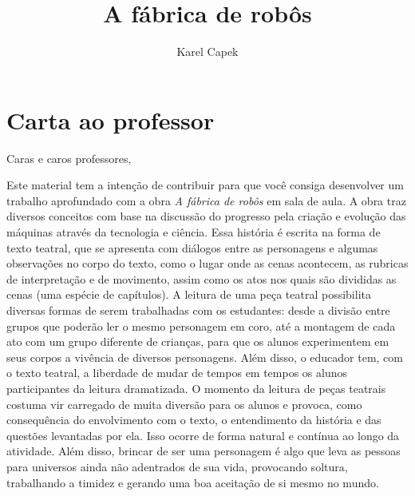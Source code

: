 \documentclass[11pt]{extarticle}
\newcommand{\AutorLivro}{Karel Capek}
\newcommand{\TituloLivro}{A fábrica de robôs}
\newcommand{\colaborador}{Gabriela Karam}
\begin{document}
\title{\TituloLivro}
\author{\AutorLivro}
\def\authornotes{\colaborador}

\date{}
\maketitle


\tableofcontents

\section{Carta ao professor}

Caras e caros professores,

Este material tem a intenção de contribuir para que você consiga desenvolver um trabalho aprofundado com a obra \textit{A fábrica de robôs} em sala de aula. A obra traz diversos conceitos com base na discussão do progresso pela criação e evolução das máquinas através da tecnologia e ciência. Essa história é escrita na forma de texto teatral, que se apresenta com diálogos entre as personagens e algumas observações no corpo do texto, como o lugar onde as cenas acontecem, as rubricas de interpretação e de movimento, assim como os atos nos quais são divididas as cenas (uma espécie de capítulos). A leitura de uma peça teatral possibilita diversas formas de serem trabalhadas com os estudantes: desde a divisão entre grupos que poderão ler o mesmo personagem em coro, até a montagem de cada ato com um grupo diferente de crianças, para que os alunos experimentem em seus corpos a vivência de diversos personagens. Além disso, o educador tem, com o texto teatral, a liberdade de mudar de tempos em tempos os alunos participantes da leitura dramatizada. O momento da leitura de peças teatrais costuma vir carregado de muita diversão para os alunos e provoca, como consequência do envolvimento com o texto, o entendimento da história e das questões levantadas por ela. Isso ocorre de forma natural e contínua ao longo da atividade. Além disso, brincar de ser uma personagem é algo que leva as pessoas para universos ainda não adentrados de sua vida, provocando soltura, trabalhando a timidez e gerando uma boa aceitação de si mesmo no mundo.
\end{document}
